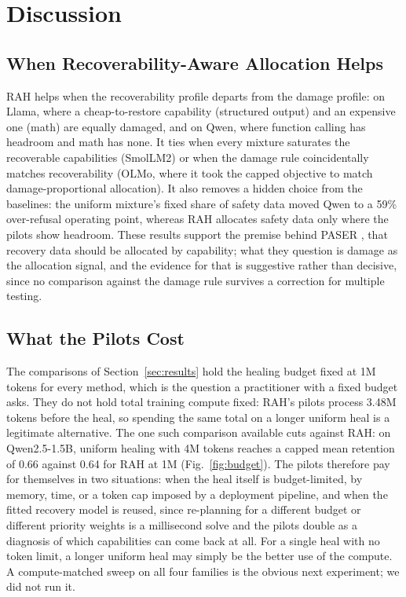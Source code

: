 \documentclass{ieeeaccess}
\newcommand{\RAH}{RAH}
\begin{document}
\section{Discussion}
\label{sec:discussion}

\subsection{When Recoverability-Aware Allocation Helps}
\RAH{} helps when the recoverability profile departs from the damage profile: on Llama, where a cheap-to-restore capability (structured output) and an expensive one (math) are equally damaged, and on Qwen, where function calling has headroom and math has none. It ties when every mixture saturates the recoverable capabilities (SmolLM2) or when the damage rule coincidentally matches recoverability (OLMo, where it took the capped objective to match damage-proportional allocation). It also removes a hidden choice from the baselines: the uniform mixture's fixed share of safety data moved Qwen to a 59\% over-refusal operating point, whereas \RAH{} allocates safety data only where the pilots show headroom. These results support the premise behind PASER \cite{he2026paser}, that recovery data should be allocated by capability; what they question is damage as the allocation signal, and the evidence for that is suggestive rather than decisive, since no comparison against the damage rule survives a correction for multiple testing.

\subsection{What the Pilots Cost}
\label{sec:compute}
The comparisons of Section~\ref{sec:results} hold the healing budget fixed at 1M tokens for every method, which is the question a practitioner with a fixed budget asks. They do not hold total training compute fixed: \RAH's pilots process 3.48M tokens before the heal, so spending the same total on a longer uniform heal is a legitimate alternative. The one such comparison available cuts against \RAH: on Qwen2.5-1.5B, uniform healing with 4M tokens reaches a capped mean retention of 0.66 against 0.64 for \RAH{} at 1M (Fig.~\ref{fig:budget}). The pilots therefore pay for themselves in two situations: when the heal itself is budget-limited, by memory, time, or a token cap imposed by a deployment pipeline, and when the fitted recovery model is reused, since re-planning for a different budget or different priority weights is a millisecond solve and the pilots double as a diagnosis of which capabilities can come back at all. For a single heal with no token limit, a longer uniform heal may simply be the better use of the compute. A compute-matched sweep on all four families is the obvious next experiment; we did not run it.
\end{document}
